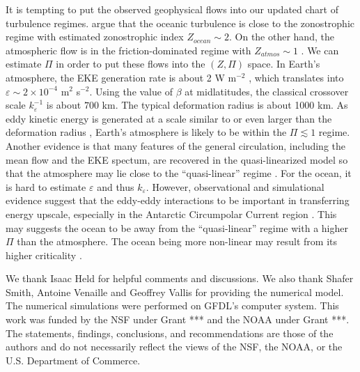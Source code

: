\documentclass{ametsoc}
\begin{document}
It is tempting to put the observed geophysical flows into our updated
chart of turbulence regimes. \citet{Galperin2004} argue that the
oceanic turbulence is close to the zonostrophic regime with estimated
zonostrophic index $Z_{ocean}\sim2$. On the other hand, the atmospheric
flow is in the friction-dominated regime with $Z_{atmos}\sim1$ \citep{Galperin2010}.
We can estimate $\Pi$ in order to put these flows into the $(Z,\Pi)$
space. In Earth's atmosphere, the EKE generation rate is about
2 W m$^{-2}$ \citep{Peixoto1984,Li2007}, which translates into $\varepsilon\sim2\times10^{-4}$
m$^{2}$ s$^{-2}$. Using the value of $\beta$ at midlatitudes, the
classical crossover scale $k_{\varepsilon}^{-1}$ is about $700$
km. The typical deformation radius is about 1000 km. As eddy kinetic
energy is generated at a scale similar to or even larger than the deformation
radius \citep{Chai2014}, Earth's atmosphere is likely to be within
the $\Pi\apprle1$ regime. Another evidence is that many features
of the general circulation, including the mean flow and the EKE spectum, 
are recovered in the quasi-linearized model
so that the atmosphere may lie close to the ``quasi-linear'' regime
\citep{O'Gorman2007}. For the ocean, it is hard to estimate $\varepsilon$
and thus $k_{\varepsilon}$. However, observational and simulational
evidence suggest that the eddy-eddy interactions to be important in
transferring energy upscale, especially in the Antarctic Circumpolar 
Current region \citep{Scott2005,Tulloch2011}. This may suggests the
ocean to be away from the ``quasi-linear'' regime with a higher $\Pi$ 
than the atmosphere. The ocean being more non-linear may result from
its higher criticality \citep{Jansen2012}.


\acknowledgments
We thank Isaac Held for helpful comments and discussions. We also thank
Shafer Smith, Antoine Venaille and Geoffrey Vallis for providing the 
numerical model.  The numerical simulations were
performed on GFDL’s computer system. This work was
funded by the NSF under Grant *** and the
NOAA under Grant ***. The statements, findings, conclusions, and recommendations are
those of the authors and do not necessarily reflect the
views of the NSF, the NOAA, or the U.S. Department
of Commerce.

 
 
\end{document}
